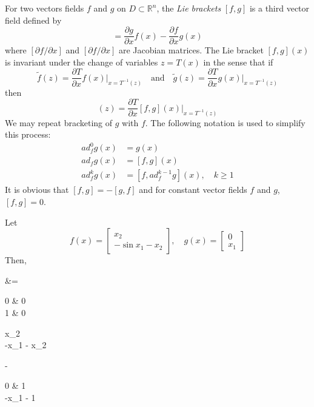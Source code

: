 \documentclass[12pt,a4paper,oneside]{book}
\begin{document}
\begin{onehalfspace}
For two vectors fields $f$ and $g$ on $D\subset\mathbb{R}^n$, the \textit{Lie 
brackets} $[f,g]$ is a third vector field defined by
\begin{equation}
[f,g]=\frac{\partial g}{\partial x}f(x)-\frac{\partial f}{\partial x}g(x)
\end{equation} 
where $[\partial f/\partial x]$ and $[\partial f/\partial x]$ are Jacobian 
matrices. The Lie bracket $[f,g](x)$ is invariant under the change of variables 
$z=T(x)$ in the sense that if
\begin{equation}
	\tilde{f}(z)=\frac{\partial T}{\partial 
	x}f(x)\Bigg|_{x=T^{-1}(z)}\quad\text{and}\quad 
	\tilde{g}(z)=\frac{\partial T}{\partial x}g(x)\Bigg|_{x=T^{-1}(z)}
\end{equation}
then
\begin{equation}
	[\tilde{f},\tilde{g}](z)=\frac{\partial T}{\partial 
		x}[{f},{g}](x)\Bigg|_{x=T^{-1}(z)}
\end{equation}
We may repeat bracketing of $g$ with $f$. The following notation is used to 
simplify this process:
\begin{equation*}
	\begin{aligned}
			ad_f^0g(x)&=g(x) \\[6pt]
			ad_fg(x)&=[f,g](x) \\[6pt]
			ad_f^kg(x)&=[f,ad_f^{k-1}g](x),\quad k\ge1
	\end{aligned}
\end{equation*}
It is obvious that $[f,g]=-[g,f]$ and for constant vector fields $f$ and $g$, 
$[f,g]=0$.
\begin{example}
	Let
	\begin{equation*}
		f(x) = \begin{bmatrix} x_2 \\[6pt] -\sin x_1 - x_2 
		\end{bmatrix},\quad		g(x)=\begin{bmatrix} 0 \\[6pt] x_1 
		\end{bmatrix}
	\end{equation*}
	Then,
	\begin{flalign*}
		[f,g] &= \begin{bmatrix} 0 & 0 \\[6pt] 1 & 0 \end{bmatrix} 
		\begin{bmatrix} x_2 \\[6pt] -\sin x_1 - x_2 \end{bmatrix}- 
		\begin{bmatrix} 0 & 1 \\[6pt] -\cos x_1 - 1 \end{bmatrix}

\end{flalign*}
\end{example}
\end{onehalfspace}
\end{document}
